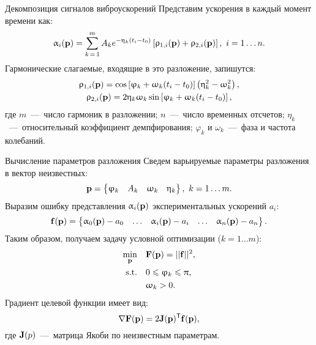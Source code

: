 \begin{frame}{Декомпозиция сигналов виброускорений}
	Представим ускорения в каждый момент времени как:
	\begin{equation}
		\upalpha_i(\mathbf{p}) = \sum\limits_{k\,=\,1} ^ m A_k e ^ {-\upeta_k (t_i - t_0)} \left[ \uprho_{1,i}(\mathbf{p}) + \uprho_{2, i}(\mathbf{p}) \right], \ i = 1 \hdots n.
	\end{equation}
	Гармонические слагаемые, входящие в это разложение, запишутся:
	\begin{equation}
		\begin{gathered}
			\uprho_{1, i}(\mathbf{p}) = \cos \left[ \upvarphi_k + \upomega_k (t_i - t_0) \right] \left( \upeta_k ^ 2 - \upomega_k ^ 2 \right), \\
			\uprho_{2, i}(\mathbf{p}) = 2 \upeta_k \upomega_k \sin \left[ \upvarphi_k + \upomega_k (t_i - t_0) \right],
		\end{gathered}
	\end{equation}
	где $ m $~---~число гармоник в разложении; $ n $~---~число временных отсчетов; $ \eta_k $~---~относительный коэффициент демпфирования; $ \varphi_k $ и $ \omega_k $~---~фаза и частота колебаний. 
\end{frame}

\begin{frame}{Вычисление параметров разложения}
	Сведем варьируемые параметры разложения в вектор неизвестных:
	\begin{equation}
		\mathbf{p} = 
		\begin{Bmatrix}
			\upvarphi_k & A_k & \upomega_k & \upeta_k
		\end{Bmatrix}, \ k = 1 \hdots m.
	\end{equation}
	Выразим ошибку представления $ \upalpha_i(\mathbf{p}) $ экспериментальных ускорений $ a_i $:
	\begin{equation}
		\mathbf{f(\mathbf{p})} = 
		\begin{Bmatrix}
			\upalpha_0(\mathbf{p}) - a_0 & \hdots & \upalpha_i(\mathbf{p}) - a_i & \hdots & \upalpha_n(\mathbf{p}) - a_n
		\end{Bmatrix}.
	\end{equation}
	Таким образом, получаем задачу условной оптимизации ($ k = 1 \hdots m $):
	\begin{equation}
		\begin{aligned}
			\min_{\mathbf{p}} \quad & \mathbf{F}(\mathbf{p}) = \vert \vert \mathbf{f} \vert \vert ^ 2, \\
			\textrm{s.t.} \quad & 0 \leqslant \upvarphi_k \leqslant \uppi, \\
		 				    & \upomega_k > 0. \\
		\end{aligned} 
	\end{equation}
	Градиент целевой функции имеет вид:
	\begin{equation}
		\nabla \mathbf{F(\mathbf{p})} = 2 \mathbf{J}(\mathbf{p}) ^ \mathsf{T} \mathbf{f(\mathbf{p})},
	\end{equation}
	где $ \mathbf{J}(p) $~---~матрица Якоби по неизвестным параметрам.
\end{frame}

